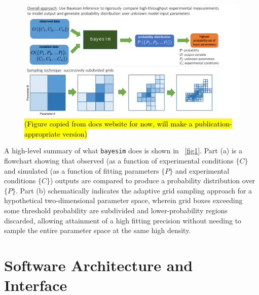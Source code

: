 \documentclass[aps,prl,amsmath,amssymb,superscriptaddress,notitlepage,groupedaddress]{revtex4-1}
\begin{document}
 \begin{figure}
   \includegraphics[width=0.7\columnwidth]{figure_1.png}
   \caption{\hl{(Figure copied from docs website for now, will make a publication-appropriate version)}}
   \label{fig1}
 \end{figure}

 A high-level summary of what \texttt{bayesim} does is shown in ~\autoref{fig1}. Part (a) is a flowchart showing that observed (as a function of experimental conditions $\{C\}$ and simulated (as a function of fitting parameters $\{P\}$ and experimental conditions $\{C\}$) outputs are compared to produce a probability distribution over $\{P\}$. Part (b) schematically indicates the adaptive grid sampling approach for a hypothetical two-dimensional parameter space, wherein grid boxes exceeding some threshold probability are subdivided and lower-probability regions discarded, allowing attainment of a high fitting precision without needing to sample the entire parameter space at the same high density.

\section*{Software Architecture and Interface}
\end{document}
